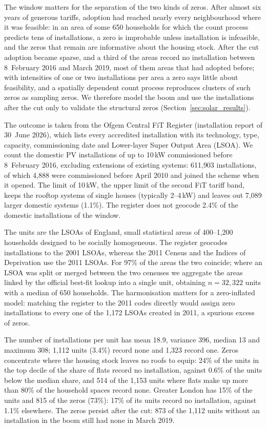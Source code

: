 The window matters for the separation of the two kinds of zeros.
After almost six years of generous tariffs, adoption had reached nearly every neighbourhood where it was feasible: in an area of some 650 households for which the count process predicts tens of installations, a zero is improbable unless installation is infeasible, and the zeros that remain are informative about the housing stock.
After the cut adoption became sparse, and a third of the areas record no installation between 8~February 2016 and March 2019, most of them areas that had adopted before; with intensities of one or two installations per area a zero says little about feasibility, and a spatially dependent count process reproduces clusters of such zeros as sampling zeros.
We therefore model the boom and use the installations after the cut only to validate the structural zeros (Section~\ref{sec:solar_results}).

The outcome is taken from the Ofgem Central FiT Register (installation report of 30~June 2026), which lists every accredited installation with its technology, type, capacity, commissioning date and Lower-layer Super Output Area (LSOA).
We count the domestic PV installations of up to 10\,kW commissioned before 8~February 2016, excluding extensions of existing systems: 611{,}903 installations, of which 4{,}888 were commissioned before April 2010 and joined the scheme when it opened.
The limit of 10\,kW, the upper limit of the second FiT tariff band, keeps the rooftop systems of single houses (typically 2--4\,kW) and leaves out 7{,}089 larger domestic systems (1.1\%).
The register does not geocode 2.4\% of the domestic installations of the window.

The units are the LSOAs of England, small statistical areas of 400--1{,}200 households designed to be socially homogeneous.
The register geocodes installations to the 2001 LSOAs, whereas the 2011 Census and the Indices of Deprivation use the 2011 LSOAs.
For 97\% of the areas the two coincide; where an LSOA was split or merged between the two censuses we aggregate the areas linked by the official best-fit lookup into a single unit, obtaining $n = 32{,}322$ units with a median of 650 households.
The harmonisation matters for a zero-inflated model: matching the register to the 2011 codes directly would assign zero installations to every one of the 1{,}172 LSOAs created in 2011, a spurious excess of zeros.

The number of installations per unit has mean 18.9, variance 396, median 13 and maximum 308; 1{,}112 units (3.4\%) record none and 1{,}323 record one.
Zeros concentrate where the housing stock leaves no roofs to equip: 24\% of the units in the top decile of the share of flats record no installation, against 0.6\% of the units below the median share, and 514 of the 1{,}153 units where flats make up more than 80\% of the household spaces record none.
Greater London has 15\% of the units and 815 of the zeros (73\%): 17\% of its units record no installation, against 1.1\% elsewhere.
The zeros persist after the cut: 873 of the 1{,}112 units without an installation in the boom still had none in March 2019.

